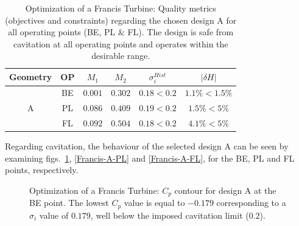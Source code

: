 \begin{table}[h!]
\begin{center}
\begin{tabular}{ |c|c|c|c|c|c| }
\hline
Geometry & OP & $M_1$ & $M_2$  & $\sigma_i^{Hist}$ & $|\delta H|$\\
\hline
& BE & $0.001$ & $0.302$ & $0.18 < 0.2$ & $ 1.1\% <1.5\%$ \\
A & PL & $0.086$ & $0.409$ & $0.19 < 0.2$ & $ 1.5\% <5\%$ \\
& FL & $0.092$ & $0.504$ & $0.18 < 0.2$ & $ 4.1\% <5\%$  \\
\hline
\end{tabular}
\caption{Optimization of a Francis Turbine: Quality metrics (objectives and constraints) regarding the chosen design A for all operating points (BE, PL $\&$ FL). The design is safe from cavitation at all operating points and operates within the desirable range.}
\label{Asum}
\end{center}
\end{table} 

Regarding cavitation, the behaviour of the selected design A can be seen by examining figs.\          \ref{Francis-A-BE}, \ref{Francis-A-PL} and \ref{Francis-A-FL}, for the BE, PL and FL points, respectively.      


\begin{figure}[h!]
\begin{minipage}[b]{1\linewidth}
 \centering
\end{minipage}
\caption{Optimization of a Francis Turbine: $C_p$ contour for design A at the BE point. The lowest $C_p$ value is equal to $-0.179$ corresponding to a $\sigma_i$ value of $0.179$, well below the imposed cavitation limit ($0.2$).}
\label{Francis-A-BE}
\end{figure}

